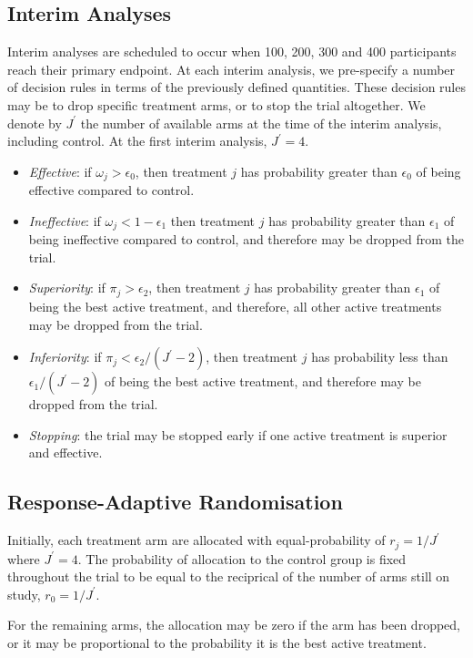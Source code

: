 \documentclass[11pt,parskip=half-]{scrartcl}
\begin{document}
\subsection*{Interim Analyses}

Interim analyses are scheduled to occur when 100, 200, 300 and 400 participants reach their primary endpoint. At each interim analysis, we pre-specify a number of decision rules in terms of the previously defined quantities. These decision rules may be to drop specific treatment arms, or to stop the trial altogether. We denote by $J^\prime$ the number of available arms at the time of the interim analysis, including control. At the first interim analysis, $J^\prime=4$.

\begin{itemize}
  \item \textit{Effective}: if $\omega_j > \epsilon_0$, then treatment $j$ has probability greater than $\epsilon_0$ of being effective compared to control.
  \item \textit{Ineffective}: if $\omega_j < 1-\epsilon_1$ then treatment $j$ has probability greater than $\epsilon_1$ of being ineffective compared to control, and therefore may be dropped from the trial.
  \item \textit{Superiority}: if $\pi_j > \epsilon_2$, then treatment $j$ has probability greater than $\epsilon_1$ of being the best active treatment, and therefore, all other active treatments may be dropped from the trial.
  \item \textit{Inferiority}: if $\pi_j < \epsilon_2/(J^\prime-2)$, then treatment $j$ has probability less than $\epsilon_1/(J^\prime-2)$ of being the best active treatment, and therefore may be dropped from the trial.
  \item \textit{Stopping}: the trial may be stopped early if one active treatment is superior and effective.
\end{itemize}

\subsection*{Response-Adaptive Randomisation}

Initially, each treatment arm are allocated with equal-probability of $r_j=1/J^\prime$ where $J^\prime=4$. The probability of allocation to the control group is fixed throughout the trial to be equal to the reciprical of the number of arms still on study, $r_0 = 1/J^\prime$.

For the remaining arms, the allocation may be zero if the arm has been dropped, or it may be proportional to the probability it is the best active treatment.
\end{document}
